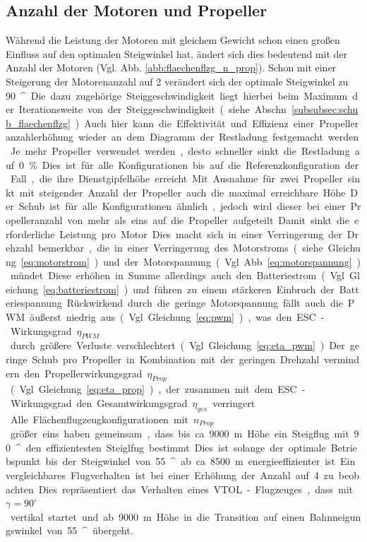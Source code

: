\subsection{Anzahl der Motoren und Propeller}
\label{subsec:anz_mot_flaechenflzg}
Während die Leistung der Motoren mit gleichem Gewicht schon einen großen Einfluss auf den optimalen Steigwinkel hat, ändert sich dies bedeutend mit der Anzahl der Motoren (Vgl. Abb. \ref{abb:flaechenflzg_n_prop}). Schon mit einer Steigerung der Motorenanzahl auf 2 verändert sich der optimale Steigwinkel zu \SI{90}{^\circ}. Die dazu zugehörige Steiggeschwindigkeit liegt hierbei beim Maximum der Iterationsweite von der Steiggeschwindigkeit (siehe Abschn. \ref{subsubsec:schub_flaechenflzg}).
Auch hier kann die Effektivität und Effizienz einer Propelleranzahlerhöhung wieder an dem Diagramm der Restladung festgemacht werden. Je mehr Propeller verwendet werden, desto schneller sinkt die Restladung auf \SI{0}{\%}. Dies ist für alle Konfigurationen bis auf die Referenzkonfiguration der Fall, die ihre Dienstgipfelhöhe erreicht. Mit Ausnahme für zwei Propeller sinkt mit steigender Anzahl der Propeller auch die maximal erreichbare Höhe. Der Schub ist für alle Konfigurationen ähnlich, jedoch wird dieser bei einer Propelleranzahl von mehr als eins auf die Propeller aufgeteilt. Damit sinkt die erforderliche Leistung pro Motor. Dies macht sich in einer Verringerung der Drehzahl bemerkbar, die in einer Verringerung des Motorstroms (siehe Gleichung \ref{eq:motorstrom}) und der Motorspannung (Vgl. Abb. \ref{eq:motorspannung}) mündet. Diese erhöhen in Summe allerdings auch den Batteriestrom (Vgl. Gleichung \ref{eq:batteriestrom}) und führen zu einem stärkeren Einbruch der Batteriespannung. Rückwirkend durch die geringe Motorspannung fällt auch die PWM äußerst niedrig aus (Vgl. Gleichung \ref{eq:pwm}), was den ESC-Wirkungsgrad \ensuremath{\eta_{PWM}} durch größere Verluste verschlechtert (Vgl. Gleichung \ref{eq:eta_pwm}). Der geringe Schub pro Propeller in Kombination mit der geringen Drehzahl vermindern den Propellerwirkungsgrad \ensuremath{\eta_{Prop}} (Vgl. Gleichung \ref{eq:eta_prop}), der zusammen mit dem ESC-Wirkungsgrad den Gesamtwirkungsgrad \ensuremath{\eta_{ges}} verringert.\\
Alle Flächenflugzeugkonfigurationen mit \ensuremath{n_{Prop}} größer eins haben gemeinsam, dass bis ca. \SI{9000}{m} Höhe ein Steigflug mit \SI{90}{^\circ} den effizientesten Steiglfug bestimmt. 
Dies ist solange der optimale Betriebspunkt bis der Steigwinkel von \SI{55}{^\circ} ab ca. \SI{8500}{m} energieeffizienter ist. Ein vergleichbares Flugverhalten ist bei einer Erhöhung der Anzahl auf 4 zu beobachten. Dies repräsentiert das Verhalten eines VTOL-Flugzeuges, dass mit \ensuremath{\gamma = 90^\circ} vertikal startet und ab \SI{9000}{m} Höhe in die Transition auf einen Bahnneigungswinkel von \SI{55}{^\circ} übergeht. 
